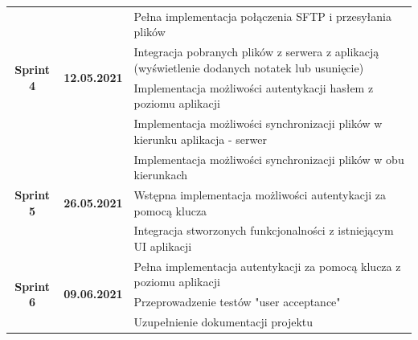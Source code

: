 \documentclass[12pt]{article}
\begin{document}
\begin{center}
\begin{longtable}{|c|c|p{8.5cm}|}
\multirow{4}{*}{\textbf{Sprint 4}} & \multirow{4}{*}{\textbf{12.05.2021}} & Pełna implementacja połączenia SFTP i przesyłania plików \\ \cline{3-3} 
 &  & Integracja pobranych plików z serwera z aplikacją (wyświetlenie dodanych notatek lub usunięcie) \\ \cline{3-3} 
 &  & Implementacja możliwości autentykacji hasłem z poziomu aplikacji \\ \cline{3-3} 
 &  & Implementacja możliwości synchronizacji plików w kierunku aplikacja - serwer \\ \hline
\multirow{3}{*}{\textbf{Sprint 5}} & \multirow{3}{*}{\textbf{26.05.2021}} & Implementacja możliwości synchronizacji plików w obu kierunkach \\ \cline{3-3} 
 &  & Wstępna implementacja możliwości autentykacji za pomocą klucza \\ \cline{3-3} 
 &  & Integracja stworzonych funkcjonalności z istniejącym UI aplikacji \\ \hline
\multirow{3}{*}{\textbf{Sprint 6}} & \multirow{3}{*}{\textbf{09.06.2021}} & Pełna implementacja autentykacji za pomocą klucza z poziomu aplikacji \\ \cline{3-3} 
 &  & Przeprowadzenie testów "user acceptance" \\ \cline{3-3} 
 &  & Uzupełnienie dokumentacji projektu \\ \hline
\end{longtable}
\end{center}
\end{document}
